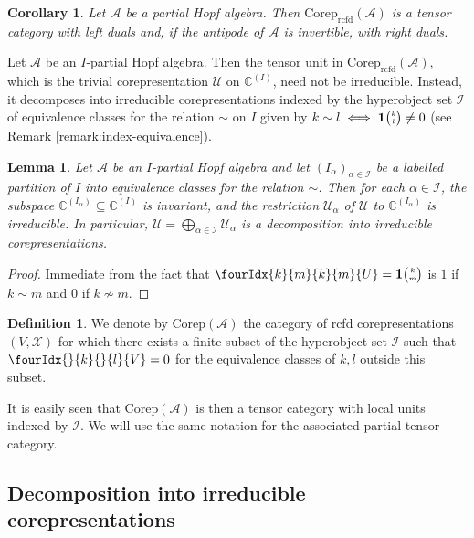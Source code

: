 \documentclass[10pt]{article}
\DeclareMathOperator{\rcf}{\mathrm{rcfd}}
\newcommand{\Corep}{\mathrm{Corep}}
\newcommand{\C}{\mathbb{C}}
\newcommand{\Grt}[3]{#1{\tiny {\begin{pmatrix} #2\\#3\end{pmatrix}}}}
\newcommand{\UnitC}[2]{\Grt{\mathbf{1}}{#1}{#2}}
\newcommand{\Gr}[5]{\fourIdx{#2}{#4}{#3}{#5}{#1}}%
\newcommand{\Gru}[3]{\Gr{#1}{}{}{#2}{#3}}
\newtheorem{Lem}[Theorem]{Lemma}
\newtheorem{Cor}[Theorem]{Corollary}
\theoremstyle{definition}
\newtheorem{Def}[Theorem]{Definition}
\numberwithin{equation}{section}
\begin{document}
\begin{Cor} \label{cor:rep-tensor-duality}
  Let $\mathscr{A}$ be a partial Hopf algebra. Then
  $\Corep_{\rcf}(\mathscr{A})$ is a tensor category with left
  duals and, if the antipode of $\mathscr{A}$ is invertible, with right duals.
\end{Cor}

Let $\mathscr{A}$ be an $I$-partial Hopf algebra.  Then the tensor
unit in $\Corep_{\rcf}(\mathscr{A})$, which is the trivial corepresentation
$\mathscr{U}$ on $\C^{(I)}$, need not be irreducible. Instead, it decomposes
into irreducible corepresentations indexed by the hyperobject set $\mathscr{I}$ of equivalence
classes for the relation $\sim$ on $I$ given by  $k \sim l \iff
  \UnitC{k}{l}\neq 0$ (see Remark
\ref{remark:index-equivalence}).
\begin{Lem}
  Let $\mathscr{A}$ be an $I$-partial Hopf algebra and let
  $(I_{\alpha})_{\alpha\in \mathscr{I}}$ be a labelled partition of $I$ into
  equivalence classes for the relation $\sim$.  Then for each $\alpha\in \mathscr{I}$, the subspace
  $\C^{(I_{\alpha})} \subseteq \C^{(I)}$ is invariant, and the restriction
  $\mathscr{U_{\alpha}}$ of $\mathscr{U}$ to $\C^{(I_{\alpha})}$ is
  irreducible. In particular, $\mathscr{U}=\bigoplus_{\alpha\in\mathscr{I}}
  \mathscr{U_{\alpha}}$ is a decomposition into irreducible corepresentations.
\end{Lem}
\begin{proof}
Immediate from the fact that $\Gr{U}{k}{k}{m}{m} = 
  \UnitC{k}{m}$  is $1$  if $k\sim m$  and $0$ if $k\not\sim m$. 
\end{proof}

\begin{Def} We denote by $\Corep(\mathscr{A})$ the category of rcfd corepresentations $(V,\mathscr{X})$ for which there exists a finite subset of the hyperobject set $\mathscr{I}$ such that $\Gru{V}{k}{l}=0$ for the equivalence classes of $k,l$ outside this subset.
\end{Def}

It is easily seen that $\Corep(\mathscr{A})$ is then a tensor category with local units indexed by $\mathscr{I}$. We will use the same notation for the associated partial tensor category. 


\subsection{Decomposition into irreducible corepresentations}
\end{document}

